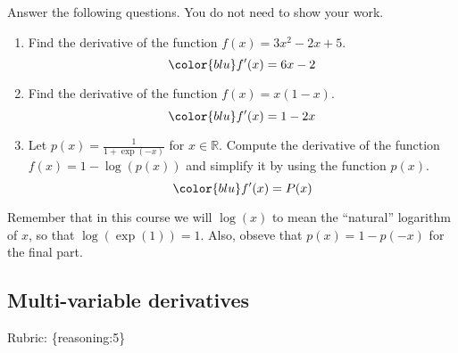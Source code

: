 \documentclass{article}
\def\rubric#1{\gre{Rubric: \{#1\}}}{}
\def\blu#1{{\color{blu}#1}}
\def\gre#1{{\color{gre}#1}}
\def\R{\mathbb{R}}
\begin{document}
\blu{Answer the following questions.} You do not need to show your work.

\begin{enumerate}
\item Find the derivative of the function $f(x) = 3x^2 -2x + 5$.
\begin{equation}\color{blu} f'(x)=6x-2 \end{equation}
\item Find the derivative of the function $f(x) = x(1-x)$.
\begin{equation}\color{blu} f'(x)=1-2x \end{equation}
\item Let $p(x) = \frac{1}{1+\exp(-x)}$ for $x \in \R$. Compute the derivative of the function $f(x) = 1-\log(p(x))$ and simplify it by using the function $p(x)$.
\begin{equation}\color{blu} f'(x)=P(x) \end{equation}
\end{enumerate}
Remember that in this course we will $\log(x)$ to mean the ``natural'' logarithm of $x$, so that $\log(\exp(1)) = 1$. Also, obseve that $p(x) = 1-p(-x)$ for the final part.

\subsection{Multi-variable derivatives}
\label{sub.multi.var}
\rubric{reasoning:5}
\end{document}
